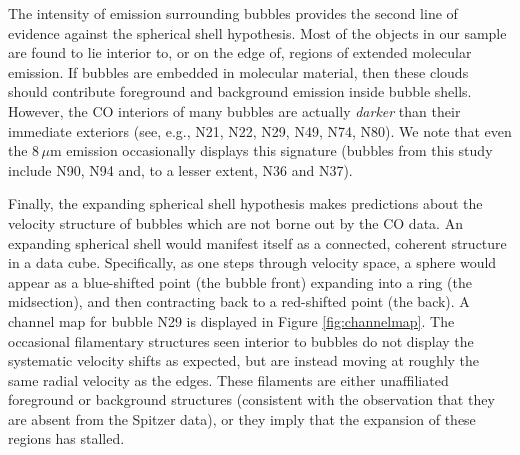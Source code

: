 The intensity of emission surrounding bubbles provides the second line of evidence against the spherical shell hypothesis.
Most of the objects in our sample are found to lie interior to, or on the edge of, regions of extended molecular emission.
If bubbles are embedded in molecular material, then these clouds should contribute foreground and background
emission inside bubble shells.
However, the CO interiors of many bubbles are actually \textit{darker} than their immediate exteriors (see,
e.g., N21, N22, N29, N49, N74, N80). We note that even the $8\, \mu $m emission occasionally displays this signature
(bubbles from this study include N90, N94 and, to a lesser extent, N36 and N37).

Finally, the expanding spherical shell hypothesis makes predictions about the velocity structure of bubbles which
are not borne out by the CO data. An expanding spherical shell would manifest itself as a
connected, coherent structure in a data cube. Specifically, as one
steps through velocity space, a sphere would appear as a blue-shifted point (the
bubble front) expanding into a ring (the midsection), and then
contracting back to a red-shifted point (the back). A channel map for bubble N29 is displayed in Figure \ref{fig:channelmap}.
The occasional filamentary structures seen interior to bubbles do not display the systematic velocity shifts as expected, but are instead moving
at roughly the same radial velocity as the edges. These filaments are either unaffiliated foreground or
background structures (consistent with the observation that they are absent from the Spitzer data), or they
imply that the expansion of these regions has stalled.

